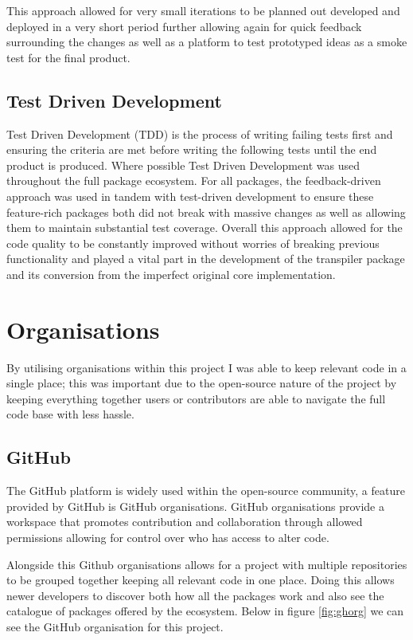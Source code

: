 \documentclass{l4proj}
\begin{document}
This approach allowed for very small iterations to be planned out developed and deployed in a very short period further allowing again for quick feedback surrounding the changes as well as a platform to test prototyped ideas as a smoke test for the final product.


\subsection{Test Driven Development}

Test Driven Development (TDD) is the process of writing failing tests first and ensuring the criteria are met before writing the following tests until the end product is produced. Where possible Test Driven Development was used throughout the full package ecosystem. For all packages, the feedback-driven approach was used in tandem with test-driven development to ensure these feature-rich packages both did not break with massive changes as well as allowing them to maintain substantial test coverage. Overall this approach allowed for the code quality to be constantly improved without worries of breaking previous functionality and played a vital part in the development of the transpiler package and its conversion from the imperfect original core implementation.

\section{Organisations}

By utilising organisations within this project I was able to keep relevant code in a single place; this was important due to the open-source nature of the project by keeping everything together users or contributors are able to navigate the full code base with less hassle.

\subsection{GitHub}
The GitHub platform is widely used within the open-source community, a feature provided by GitHub is GitHub organisations. GitHub organisations provide a workspace that promotes contribution and collaboration through allowed permissions allowing for control over who has access to alter code. 

\text Alongside this Github organisations allows for a project with multiple repositories to be grouped together keeping all relevant code in one place. Doing this allows newer developers to discover both how all the packages work and also see the catalogue of packages offered by the ecosystem. Below in figure \ref{fig:ghorg} we can see the GitHub organisation for this project.
\end{document}
